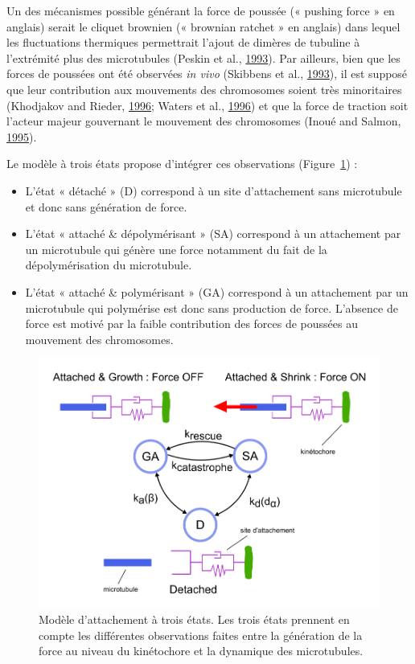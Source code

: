 \documentclass[12pt,a4paper,twoside,openright]{book}
\begin{document}
Un des mécanismes possible générant la force de poussée (« pushing force
» en anglais) serait le cliquet brownien (« brownian ratchet » en
anglais) dans lequel les fluctuations thermiques permettrait l'ajout de
dimères de tubuline à l'extrémité plus des microtubules (Peskin et al.,
\hyperref[ref-Peskin1993]{1993}). Par ailleurs, bien que les forces de
poussées ont été observées \emph{in vivo} (Skibbens et al.,
\hyperref[ref-Skibbens1993]{1993}), il est supposé que leur contribution
aux mouvements des chromosomes soient très minoritaires (Khodjakov and
Rieder, \hyperref[ref-Khodjakov1996]{1996}; Waters et al.,
\hyperref[ref-Waters1996a]{1996}) et que la force de traction soit
l'acteur majeur gouvernant le mouvement des chromosomes (Inoué and
Salmon, \hyperref[ref-Inoue1995]{1995}).

Le modèle à trois états propose d'intégrer ces observations
(Figure~\ref{fig:three_states}) :

\begin{itemize}
\item
  L'état « détaché » (D) correspond à un site d'attachement sans
  microtubule et donc sans génération de force.
\item
  L'état « attaché \& dépolymérisant » (SA) correspond à un attachement
  par un microtubule qui génère une force notamment du fait de la
  dépolymérisation du microtubule.
\item
  L'état « attaché \& polymérisant » (GA) correspond à un attachement
  par un microtubule qui polymérise est donc sans production de force.
  L'absence de force est motivé par la faible contribution des forces de
  poussées au mouvement des chromosomes.
\end{itemize}

\begin{figure}[htbp]
\centering
\includegraphics{figures/results/modelling/three_states.png}
\caption[Modèle d'attachement à trois états]{\label{fig:three_states}Modèle
d'attachement à trois états. Les trois états prennent en compte les
différentes observations faites entre la génération de la force au
niveau du kinétochore et la dynamique des microtubules.}
\end{figure}
\end{document}
